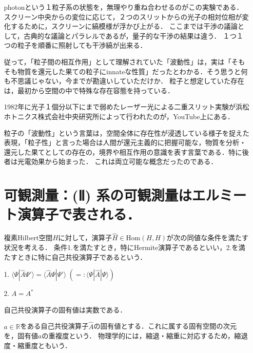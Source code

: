 \documentclass[uplatex, dvipdfmx]{jsreport}
\begin{document}
\begin{fact}
    photonという１粒子系の状態を，無理やり重ね合わせるのがこの実験である．
    スクリーン中央からの変位に応じて，２つのスリットからの光子の相対位相が変化するために，スクリーンに縞模様が浮かび上がる．
    ここまでは干渉の議論として，古典的な議論とパラレルであるが，量子的な干渉の結果は違う．
    １つ１つの粒子を順番に照射しても干渉縞が出来る．

    従って，「粒子間の相互作用」として理解されていた「波動性」は，実は「そもそも物質を還元した果ての粒子にinnateな性質」だったとわかる．そう思うと何も不思議じゃない，今までが勘違いしていただけか．
    粒子と想定していた存在は，最初から空間の中で特殊な存在容態を持っている．
\end{fact}
\begin{remark}
    1982年に光子１個分以下にまで弱めたレーザー光による二重スリット実験が浜松ホトニクス株式会社中央研究所によって行われたのが，YouTube上にある．

    粒子の「波動性」という言葉は，空間全体に存在性が浸透している様子を捉えた表現，「粒子性」と言った場合は人間が還元主義的に把握可能な，物質を分析・還元した果てとしての存在の，境界や相互作用の意識を表す言葉である．特に後者は光電効果から始まった．
    これは両立可能な概念だったのである．
\end{remark}

\section{可観測量：(Ⅱ) 系の可観測量はエルミート演算子で表される．}

\begin{definition}
    複素Hilbert空間$H$に対して，演算子$\hat{H}\in\mathrm{Hom}(H,H)$が次の同値な条件を満たす状況を考える．
    条件1.を満たすとき，特にHermite演算子であるといい，2.を満たすときに特に自己共役演算子であるという．
    
    1. $\langle\Psi |\hat{A}\Psi'\rangle = \langle\hat{A}\Psi |\Psi'\rangle \; (=:\langle\Psi|\hat{A}|\Psi\rangle)$

    2. $A=A^*$
\end{definition}

\begin{proposition}[自己共役演算子の固有値]
    自己共役演算子の固有値は実数である．
\end{proposition}

\begin{definition}[重複度]
    $a\in\mathbb{R}$をある自己共役演算子$\hat{A}$の固有値とする．これに属する固有空間の次元を，固有値$a$の重複度という．
    物理学的には，縮退・縮重に対応するため，縮退度・縮重度ともいう．
\end{definition}
\end{document}
